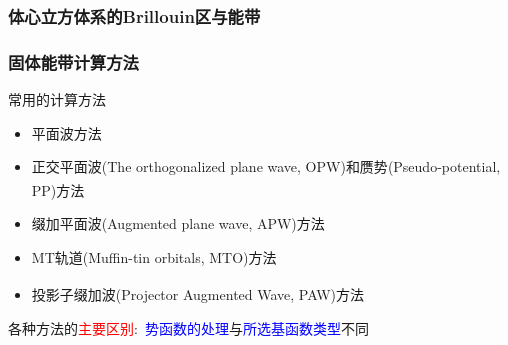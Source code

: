 \documentclass[cjk,slidestop,compress,mathserif,blue]{beamer}
\newcommand{\upcite}[1]{\hspace{0ex}\textsuperscript{\cite{#1}}} %
\begin{document}
\frame
{
	\frametitle{体心立方体系的\textrm{Brillouin}区与能带}
\vspace{10pt}
\begin{figure}[h!]
\centering
\hspace*{-0.30in}
\label{Band_Gap_BCC_GeF4}
\end{figure}
}

\frame
{
\frametitle{固体能带计算方法}
\vskip 10pt
常用的计算方法
\begin{itemize}%
\setlength{\itemsep}{12pt}
	\item	平面波方法
	\item	正交平面波\textrm{(The orthogonalized plane wave, OPW)}和赝势\textrm{(Pseudo-potential, PP)}方法\upcite{Singh,PRB41-7892_1990,JPCM6-8245_1994}
	\item	缀加平面波\textrm{(Augmented plane wave, APW)}方法
	\item	\textrm{MT}轨道\textrm{(Muffin-tin orbitals, MTO)}方法
	\item	投影子缀加波\textrm{(Projector Augmented Wave, PAW)}方法\upcite{PRB50-17953_1994,PRB59-1758_1999}
\end{itemize}
\vskip 5pt 各种方法的\textcolor{red}{主要区别}:~\textcolor{blue}{势函数的处理}与\textcolor{blue}{所选基函数类型}不同
}
\end{document}
